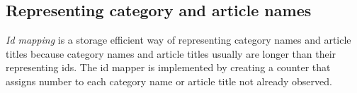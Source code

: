 \subsection{Representing category and article names}
\emph{Id mapping} is a storage efficient way of representing category names and article titles because category names and article titles usually are longer than their representing ids. The id mapper is implemented by creating a counter that assigns number to each category name or article title not already observed. 


